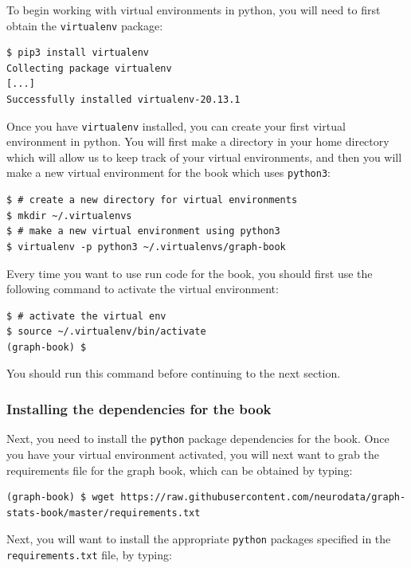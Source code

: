 To begin working with virtual environments in python, you will need to first obtain the \texttt{virtualenv} package:

\begin{lstlisting}[style=bash]
$ pip3 install virtualenv
Collecting package virtualenv
[...]
Successfully installed virtualenv-20.13.1
\end{lstlisting}

Once you have \texttt{virtualenv} installed, you can create your first virtual environment in python. You will first make a directory in your home directory which will allow us to keep track of your virtual environments, and then you will make a new virtual environment for the book which uses \texttt{python3}:

\begin{lstlisting}[style=bash]
$ # create a new directory for virtual environments
$ mkdir ~/.virtualenvs
$ # make a new virtual environment using python3
$ virtualenv -p python3 ~/.virtualenvs/graph-book
\end{lstlisting}

Every time you want to use run code for the book, you should first use the following command to activate the virtual environment:

\begin{lstlisting}[style=bash]
$ # activate the virtual env
$ source ~/.virtualenv/bin/activate
(graph-book) $ 
\end{lstlisting}

You should run this command before continuing to the next section.

\subsubsection{Installing the dependencies for the book}

Next, you need to install the \texttt{python} package dependencies for the book. Once you have your virtual environment activated, you will next want to grab the requirements file for the graph book, which can be obtained by typing:


\begin{lstlisting}[style=bash]
(graph-book) $ wget https://raw.githubusercontent.com/neurodata/graph-stats-book/master/requirements.txt
\end{lstlisting}

Next, you will want to install the appropriate \texttt{python} packages specified in the \texttt{requirements.txt} file, by typing:

